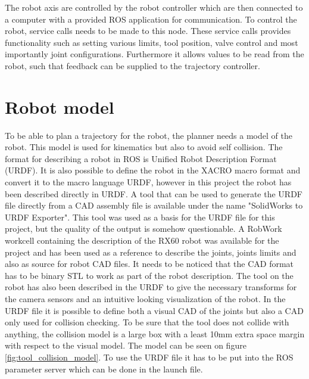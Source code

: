 The robot axis are controlled by the robot controller which are then connected to a computer with a provided ROS application for communication. To control the robot, service calls needs to be made to this node. These service calls provides functionality such as setting various limits, tool position, valve control and most importantly joint configurations. Furthermore it allows values to be read from the robot, such that feedback can be supplied to the trajectory controller.

\section{Robot model}
\label{sec:robot_model}
To be able to plan a trajectory for the robot, the planner needs a model of the robot. This model is used for kinematics but also to avoid self collision. The format for describing a robot in ROS is Unified Robot Description Format (URDF). It is also possible to define the robot in the XACRO macro format and convert it to the macro language URDF, however in this project the robot has been described directly in URDF.
A tool that can be used to generate the URDF file directly from a CAD assembly file is available under the name "SolidWorks to URDF Exporter". This tool was used as a basis for the URDF file for this project, but the quality of the output is somehow questionable. A RobWork workcell containing the description of the RX60 robot was available for the project and has been used as a reference to describe the joints, joints limits and also as source for robot CAD files. It needs to be noticed that the CAD format has to be binary STL to work as part of the robot description. The tool on the robot has also been described in the URDF to give the necessary transforms for the camera sensors and an intuitive looking visualization of the robot. In the URDF file it is possible to define both a visual CAD of the joints but also a CAD only used for collision checking. To be sure that the tool does not collide with anything, the collision model is a large box with a least 10mm extra space margin with respect to the visual model. The model can be seen on figure \ref{fig:tool_collision_model}. To use the URDF file it has to be put into the ROS parameter server which can be done in the launch file.

